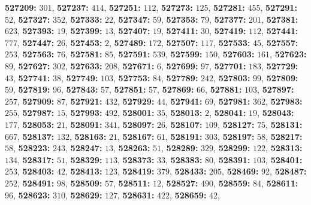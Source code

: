 \textsf{\bfseries 527209:} $301$, \textsf{\bfseries 527237:} $414$, \textsf{\bfseries 527251:} $112$, \textsf{\bfseries 527273:} $125$, \textsf{\bfseries 527281:} $455$, \textsf{\bfseries 527291:} $52$, \textsf{\bfseries 527327:} $352$, \textsf{\bfseries 527333:} $22$, \textsf{\bfseries 527347:} $59$, \textsf{\bfseries 527353:} $79$, \textsf{\bfseries 527377:} $201$, \textsf{\bfseries 527381:} $623$, \textsf{\bfseries 527393:} $19$, \textsf{\bfseries 527399:} $13$, \textsf{\bfseries 527407:} $19$, \textsf{\bfseries 527411:} $30$, \textsf{\bfseries 527419:} $112$, \textsf{\bfseries 527441:} $777$, \textsf{\bfseries 527447:} $26$, \textsf{\bfseries 527453:} $2$, \textsf{\bfseries 527489:} $172$, \textsf{\bfseries 527507:} $117$, \textsf{\bfseries 527533:} $45$, \textsf{\bfseries 527557:} $253$, \textsf{\bfseries 527563:} $76$, \textsf{\bfseries 527581:} $85$, \textsf{\bfseries 527591:} $539$, \textsf{\bfseries 527599:} $150$, \textsf{\bfseries 527603:} $161$, \textsf{\bfseries 527623:} $89$, \textsf{\bfseries 527627:} $302$, \textsf{\bfseries 527633:} $208$, \textsf{\bfseries 527671:} $6$, \textsf{\bfseries 527699:} $97$, \textsf{\bfseries 527701:} $183$, \textsf{\bfseries 527729:} $43$, \textsf{\bfseries 527741:} $38$, \textsf{\bfseries 527749:} $103$, \textsf{\bfseries 527753:} $84$, \textsf{\bfseries 527789:} $242$, \textsf{\bfseries 527803:} $99$, \textsf{\bfseries 527809:} $59$, \textsf{\bfseries 527819:} $96$, \textsf{\bfseries 527843:} $57$, \textsf{\bfseries 527851:} $57$, \textsf{\bfseries 527869:} $66$, \textsf{\bfseries 527881:} $103$, \textsf{\bfseries 527897:} $257$, \textsf{\bfseries 527909:} $87$, \textsf{\bfseries 527921:} $432$, \textsf{\bfseries 527929:} $44$, \textsf{\bfseries 527941:} $69$, \textsf{\bfseries 527981:} $362$, \textsf{\bfseries 527983:} $255$, \textsf{\bfseries 527987:} $15$, \textsf{\bfseries 527993:} $492$, \textsf{\bfseries 528001:} $35$, \textsf{\bfseries 528013:} $2$, \textsf{\bfseries 528041:} $19$, \textsf{\bfseries 528043:} $177$, \textsf{\bfseries 528053:} $21$, \textsf{\bfseries 528091:} $341$, \textsf{\bfseries 528097:} $26$, \textsf{\bfseries 528107:} $109$, \textsf{\bfseries 528127:} $75$, \textsf{\bfseries 528131:} $667$, \textsf{\bfseries 528137:} $132$, \textsf{\bfseries 528163:} $21$, \textsf{\bfseries 528167:} $61$, \textsf{\bfseries 528191:} $303$, \textsf{\bfseries 528197:} $58$, \textsf{\bfseries 528217:} $58$, \textsf{\bfseries 528223:} $243$, \textsf{\bfseries 528247:} $13$, \textsf{\bfseries 528263:} $51$, \textsf{\bfseries 528289:} $329$, \textsf{\bfseries 528299:} $122$, \textsf{\bfseries 528313:} $134$, \textsf{\bfseries 528317:} $51$, \textsf{\bfseries 528329:} $113$, \textsf{\bfseries 528373:} $33$, \textsf{\bfseries 528383:} $80$, \textsf{\bfseries 528391:} $103$, \textsf{\bfseries 528401:} $253$, \textsf{\bfseries 528403:} $42$, \textsf{\bfseries 528413:} $123$, \textsf{\bfseries 528419:} $379$, \textsf{\bfseries 528433:} $205$, \textsf{\bfseries 528469:} $92$, \textsf{\bfseries 528487:} $252$, \textsf{\bfseries 528491:} $98$, \textsf{\bfseries 528509:} $57$, \textsf{\bfseries 528511:} $12$, \textsf{\bfseries 528527:} $490$, \textsf{\bfseries 528559:} $84$, \textsf{\bfseries 528611:} $96$, \textsf{\bfseries 528623:} $310$, \textsf{\bfseries 528629:} $127$, \textsf{\bfseries 528631:} $422$, \textsf{\bfseries 528659:} $42$, 
